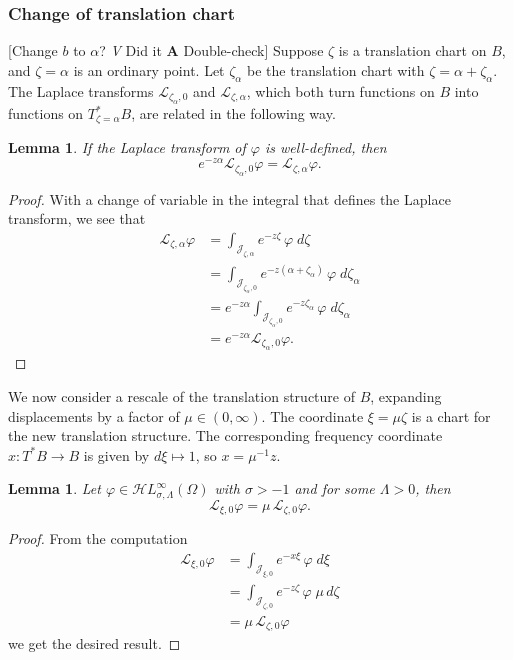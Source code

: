 \documentclass{article}
\newcommand{\singexp}[2]{\mathcal{H}L^\infty_{#1, #2}}
\newcommand{\maps}{\colon}
\newcommand{\laplace}{\mathcal{L}}
\theoremstyle{definition}
\theoremstyle{plain}
\newtheorem{lemma}[definition]{Lemma}
\newenvironment{todo}{\color{Coral}}{\color{black}}
\begin{document}
\subsubsection{Change of translation chart}\label{sec:change-translation}
\begin{todo}[Change $b$ to $\alpha$? \textit{V} Did it \textbf{A} Double-check]\end{todo} Suppose $\zeta$ is a translation chart on $B$, and $\zeta = \alpha$ is an ordinary point. Let $\zeta_\alpha$ be the translation chart with $\zeta = \alpha + \zeta_\alpha$. The Laplace transforms $\laplace_{\zeta_\alpha, 0}$ and $\laplace_{\zeta, \alpha}$, which both turn functions on $B$ into functions on $T^*_{\zeta = \alpha}B$, are related in the following way.
\begin{lemma}\label{translation}
If the Laplace transform of $\varphi$ is well-defined, then
   \begin{equation}
    \label{change-chart}
    e^{-z\alpha} \laplace_{\zeta_\alpha, 0} \varphi = \laplace_{\zeta, \alpha} \varphi.
\end{equation}
\end{lemma}
\begin{proof}
With a change of variable in the integral that defines the Laplace transform, we see that
\begin{align*}
\laplace_{\zeta, \alpha} \varphi & = \int_{\mathcal{J}_{\zeta,\alpha}} e^{-z \zeta}\,\varphi\;d\zeta \\
& = \int_{\mathcal{J}_{\zeta_\alpha,0}} e^{-z(\alpha + \zeta_\alpha)}\,\varphi\;d\zeta_\alpha \\
& = e^{-z\alpha } \int_{\mathcal{J}_{\zeta_\alpha,0}} e^{-z\zeta_\alpha}\,\varphi\;d\zeta_\alpha \\
& = e^{-z\alpha } \laplace_{\zeta_\alpha, 0} \varphi.
\end{align*}
\end{proof}
We now consider a rescale of the translation structure of $B$, expanding displacements by a factor of $\mu \in (0, \infty)$. The coordinate $\xi = \mu\zeta$ is a chart for the new translation structure. The corresponding frequency coordinate $x \maps T^*B \to B$ is given by $d\xi \mapsto 1$, so $x = \mu^{-1} z$. 
\begin{lemma}
Let $\varphi\in\singexp{\sigma}{\Lambda}(\Omega)$ with $\sigma>-1$ and for some $\Lambda>0$, then
    \[ \laplace_{\xi, 0} \varphi = \mu\,\laplace_{\zeta, 0} \varphi. \]
\end{lemma}
\begin{proof}
    From the computation 
    \begin{align*}
\laplace_{\xi, 0} \varphi & = \int_{\mathcal{J}_{\xi, 0}} e^{-x\xi}\,\varphi\;d\xi \\
& = \int_{\mathcal{J}_{\zeta, 0}} e^{-z \zeta}\,\varphi\;\mu\,d\zeta \\
& = \mu\,\laplace_{\zeta, 0} \varphi
\end{align*}
we get the desired result. 
\end{proof}
%
\end{document}
